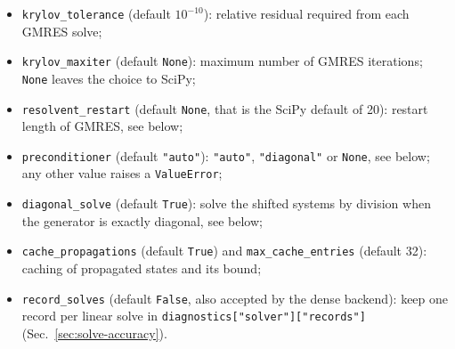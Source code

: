 \documentclass[11pt]{article}
\begin{document}
\begin{itemize}
    \item \texttt{krylov\_tolerance} (default \(10^{-10}\)): relative residual
    required from each GMRES solve;
    \item \texttt{krylov\_maxiter} (default \texttt{None}): maximum number of
    GMRES iterations; \texttt{None} leaves the choice to SciPy;
    \item \texttt{resolvent\_restart} (default \texttt{None}, that is the
    SciPy default of 20): restart length of GMRES, see below;
    \item \texttt{preconditioner} (default \texttt{"auto"}): \texttt{"auto"},
    \texttt{"diagonal"} or \texttt{None}, see below; any other value raises a
    \texttt{ValueError};
    \item \texttt{diagonal\_solve} (default \texttt{True}): solve the shifted systems by division when the generator is exactly diagonal, see below;
    \item \texttt{cache\_propagations} (default \texttt{True}) and
    \texttt{max\_cache\_entries} (default 32): caching of propagated states and
    its bound;
    \item \texttt{record\_solves} (default \texttt{False}, also accepted by the dense backend): keep one record per linear solve in \texttt{diagnostics["solver"]["records"]} (Sec.~\ref{sec:solve-accuracy}).
\end{itemize}
\end{document}
